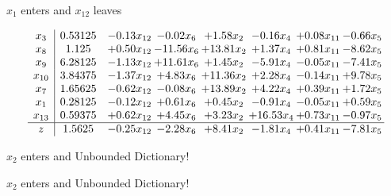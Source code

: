 \documentclass[9pt]{article}
\begin{document}
 $ x_{1} $ enters and $ x_{12} $ leaves 

 \[\begin{array}{c| c c@{\hskip 2pt} c@{\hskip 2pt} c@{\hskip 2pt} c@{\hskip 2pt} c@{\hskip 2pt} c@{\hskip 2pt} }
 x_{3}   &  0.53125 & -0.13 x_{12} & -0.02 x_{6} & +  1.58 x_{2} & -0.16 x_{4} & +  0.08 x_{11} & -0.66 x_{5}\\
 x_{8}   &  1.125 & +  0.50 x_{12} & -11.56 x_{6} & + 13.81 x_{2} & +  1.37 x_{4} & +  0.81 x_{11} & -8.62 x_{5}\\
 x_{9}   &  6.28125 & -1.13 x_{12} & + 11.61 x_{6} & +  1.45 x_{2} & -5.91 x_{4} & -0.05 x_{11} & -7.41 x_{5}\\
 x_{10}   &  3.84375 & -1.37 x_{12} & +  4.83 x_{6} & + 11.36 x_{2} & +  2.28 x_{4} & -0.14 x_{11} & +  9.78 x_{5}\\
 x_{7}   &  1.65625 & -0.62 x_{12} & -0.08 x_{6} & + 13.89 x_{2} & +  4.22 x_{4} & +  0.39 x_{11} & +  1.72 x_{5}\\
 x_{1}   &  0.28125 & -0.12 x_{12} & +  0.61 x_{6} & +  0.45 x_{2} & -0.91 x_{4} & -0.05 x_{11} & +  0.59 x_{5}\\
 x_{13}   &  0.59375 & +  0.62 x_{12} & +  4.45 x_{6} & +  3.23 x_{2} & + 16.53 x_{4} & +  0.73 x_{11} & -0.97 x_{5}\\
\hline
z    &  1.5625 & -0.25 x_{12} & -2.28 x_{6} & +  8.41 x_{2} & -1.81 x_{4} & +  0.41 x_{11} & -7.81 x_{5}\\
\end{array}\]


 $ x_{2} $ enters and Unbounded Dictionary!


 $ x_{2} $ enters and Unbounded Dictionary!
\end{document}

